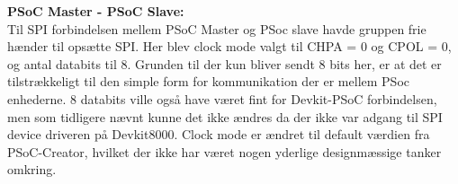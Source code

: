 \textbf{PSoC Master - PSoC Slave:} \\

Til SPI forbindelsen mellem PSoC Master og PSoc slave havde gruppen frie hænder til opsætte SPI. Her blev clock mode valgt til CHPA = 0 og CPOL = 0, og 
antal databits til 8. Grunden til der kun bliver sendt 8 bits her, er at det er tilstrækkeligt til den simple form for kommunikation der er mellem PSoc enhederne.
8 databits ville også have været fint for Devkit-PSoC forbindelsen, men som tidligere nævnt kunne det ikke ændres da der ikke var adgang til SPI device driveren
på Devkit8000. Clock mode er ændret til default værdien fra PSoC-Creator, hvilket der ikke har været nogen yderlige designmæssige tanker omkring. 

